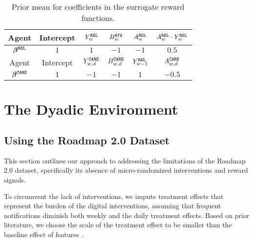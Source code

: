 \begin{table}[hpt]
    \centering
    \caption{Prior mean for coefficients in the surrogate reward functions.}
    \label{tab:prior}
    \begin{tabular}{c|c|c|c|c|c}
    \toprule
    Agent & Intercept & $Y_w^{\tiny\texttt{REL}}$ & $B_w^{\tiny\texttt{AYA}}$  & $A_w^{\tiny\texttt{REL}}$ & $A_w^{\tiny\texttt{REL}} \cdot Y_w^{\tiny\texttt{REL}}$ \\
    \midrule
    ${\bm{\beta}}^{\tiny\texttt{REL}}$ & $1$ & $1$ & $-1$ & $-1$ & $0.5$ \\
    \midrule
    \midrule
    Agent & Intercept & $Y_{w,d}^{\tiny\texttt{CARE}}$ & $B_{w,d}^{\tiny\texttt{CARE}}$ & $Y_{w-1}^{\tiny\texttt{REL}}$ & $A_{w,d}^{\tiny\texttt{CARE}}$  \\
    \midrule
    ${\bm{\beta}}^{\tiny\texttt{CARE}}$ & $1$ & $-1$ & $-1$ & $1$ & $-0.5$  \\
    \bottomrule
    \end{tabular}
    \end{table}
    
\section{The Dyadic Environment}
\label{app:testbed}





\subsection{Using the Roadmap 2.0 Dataset}


This section outlines our approach to addressing the limitations of the Roadmap 2.0 dataset, specifically its absence of micro-randomized interventions and reward signals.

To circumvent the lack of interventions, we impute treatment effects that represent the burden of the digital interventions, assuming that frequent notifications diminish both weekly and the daily treatment effects. Based on prior literature, we choose the scale of the treatment effect to be smaller than the baseline effect of features \cite{box1987empirical}. 

